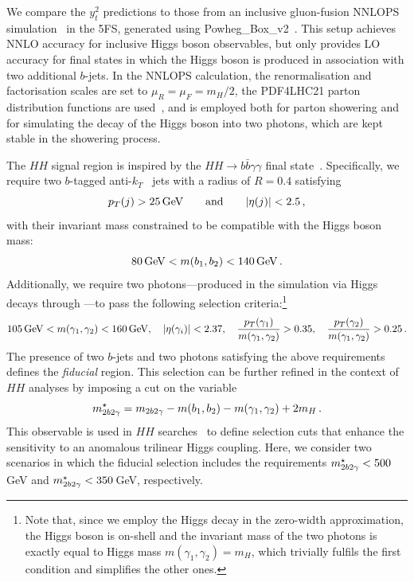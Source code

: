 \documentclass[11pt,a4paper]{article}
\begin{document}
We compare the $y_t^2$ predictions to those from an inclusive 
gluon-fusion {\sc NNLOPS} simulation~\cite{hamilton:2012rf,hamilton:2013fea,hamilton:2015nsa} in the 5FS, 
generated using {\sc Powheg\_Box\_v2}~\cite{nason:2004rx,frixione:2007vw,alioli:2010xd}. 
This setup achieves NNLO accuracy for inclusive Higgs boson observables, but only provides LO accuracy for final states 
in which the Higgs boson is produced in association with two additional $b$-jets. In the {\sc NNLOPS} calculation, the 
renormalisation and factorisation scales are set to $\mu_R = \mu_F = m_H/2$, the PDF4LHC21 parton distribution functions 
are used~\cite{PDF4LHCWorkingGroup:2022cjn}, and  is employed both for parton showering and for simulating 
the decay of the Higgs boson into two photons, which are kept stable in the showering process.

The $HH$ signal region is inspired by the $HH \to b\bar{b}\gamma\gamma$ final state~\cite{HDBS-2021-10,CMS-HIG-19-018}. Specifically, we require two $b$-tagged anti-$k_T$~\cite{Cacciari:2005hq,Cacciari:2008gp,Cacciari:2011ma} jets with
a radius of $R=0.4$ satisfying
\begin{equation}
\label{eq:ptjcuts}
p_T(j) > 25\,\mathrm{GeV} \qquad {\rm and} \qquad |\eta(j)| < 2.5\,,
\end{equation}
with their invariant mass constrained to be compatible with the Higgs boson mass:
\begin{equation}
    \label{eq:mbjcut}
    80\,\mathrm{GeV} < m(b_1,b_2)< 140\,\mathrm{GeV}\,.
\end{equation}
Additionally, we require two photons—produced in the simulation via Higgs decays through —to pass the following selection criteria:\footnote{Note that, since
we employ the Higgs decay in the zero-width approximation, the Higgs boson is on-shell and the invariant mass of the two photons is exactly equal to Higgs mass
$m(\gamma_1, \gamma_2)=m_H$, which trivially fulfils the first condition and simplifies the other ones.}
\begin{equation}
\label{eq:photoncuts}
    105\,\mathrm{GeV} < m(\gamma_1, \gamma_2) < 160\,\mathrm{GeV}, \quad |\eta(\gamma_i)|< 2.37, \quad
    \frac{p_T(\gamma_1)}{m(\gamma_1, \gamma_2)} > 0.35, \quad \frac{p_T(\gamma_2)}{m(\gamma_1, \gamma_2)} > 0.25\,.
\end{equation}
The presence of two $b$-jets and two photons satisfying the above requirements defines the \emph{fiducial} region. This selection can be further refined in the context of $HH$ analyses by imposing a cut on the variable
\begin{equation}
\label{eq:mbbggs}
    m_{2b2\gamma}^{\star} = m_{2b2\gamma} - m(b_1,b_2) - m(\gamma_1,\gamma_2) + 2m_H \,.
\end{equation}
This observable is used in $HH$ searches~\cite{HDBS-2021-10,HDBS-2019-27,CMS-HIG-19-018,ATLAS:2025hhd} to define selection cuts that enhance the sensitivity
to an anomalous trilinear Higgs coupling. 
Here, we consider two scenarios 
in which the fiducial selection includes the requirements $m_{2b2\gamma}^{\star} < 500$\,GeV and $m_{2b2\gamma}^{\star} < 350$\,GeV, respectively. 
\end{document}
